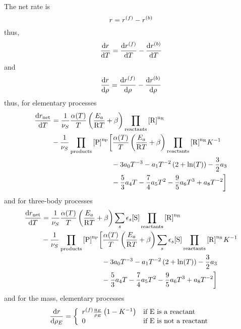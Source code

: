 The net rate is
\begin{equation}
\rate = \fwdrate - \bkwdrate
\end{equation}
thus,
\begin{equation}
\doverdT{\rate} = \doverdT{\fwdrate} - \doverdT{\bkwdrate}
\end{equation}
and
\begin{equation}
\doverdm{\rate} = \doverdm{\fwdrate} - \doverdm{\bkwdrate}
\end{equation}
thus, for elementary processes
\begin{equation}
\begin{split}
\doverdT{r_{\text{net}}} &= \frac{1}{\scoef[S]} \frac{\kinMod}{T} \left(\frac{E_a}{\Rg T} + \beta\right) \prodReac\\
& -
\frac{1}{\scoef[S]} \prodProd 
\bigg[
        \frac{\kinMod}{T} \left(\frac{E_a}{\Rg T} + \beta\right)\prodReac \Eqconst^{-1} \\
                  &\hspace{3cm} - 3\tc{0}T^{-3} - \tc{1} T^{-2} \left(2 + \ln(T)\right) - \frac{3}{2} \tc{3} \\
                  &\hspace{3cm} - \frac{5}{3} \tc{4} T - \frac{7}{4}\tc{5} T^2 - \frac{9}{5}\tc{6} T^3 + \tc{8} T^{-2} \bigg]
\end{split}
\end{equation}
and for three-body processes
\begin{equation}
\begin{split}
\doverdT{r_{\text{net}}} &= \frac{1}{\scoef[S]} \frac{\kinMod}{T} \left(\frac{E_a}{\Rg T} + \beta\right) \threeBody\prodReac\\
& -
\frac{1}{\scoef[S]} \prodProd 
\bigg[
        \frac{\kinMod}{T} \left(\frac{E_a}{\Rg T} + \beta\right)\threeBody\prodReac \Eqconst^{-1} \\
                  &\hspace{3cm} - 3\tc{0}T^{-3} - \tc{1} T^{-2} \left(2 + \ln(T)\right) - \frac{3}{2} \tc{3} \\
                  &\hspace{3cm} - \frac{5}{3} \tc{4} T - \frac{7}{4}\tc{5} T^2 - \frac{9}{5}\tc{6} T^3 + \tc{8} T^{-2} \bigg]
\end{split}
\end{equation}
and for the mass, elementary processes
\begin{equation}
\doverdm[E]{\rate} = \left\{\begin{array}{ll}
                        \fwdrate \frac{\scoefabs[E]}{\mass[E]}\left(1-\Eqconst^{-1}\right) & \text{if \ce{E} is a reactant} \\
                        0                                                                & \text{if \ce{E} is not a reactant} \\
                      \end{array}\right.
\end{equation}
